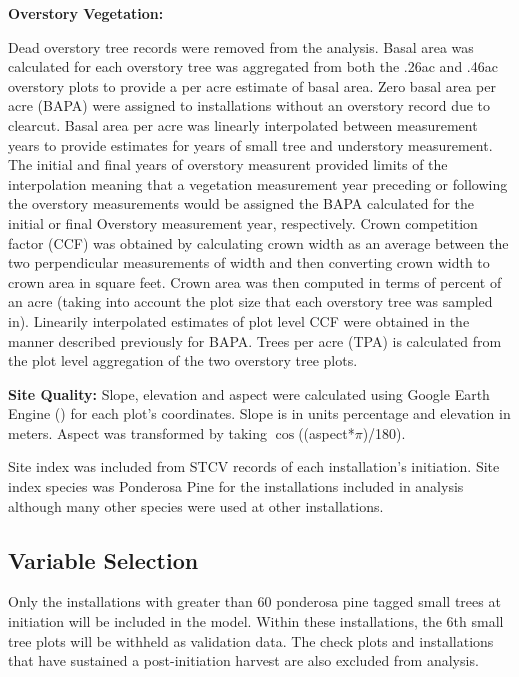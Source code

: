 \documentclass[11pt, letterpaper, fleqn]{article}
\begin{document}
\textbf{Overstory Vegetation:}

Dead overstory tree records were removed from the analysis.  Basal area was calculated for each overstory tree was aggregated from both the .26ac and .46ac overstory plots to provide a per acre estimate of basal area. Zero basal area per acre (BAPA) were assigned to installations without an overstory record due to clearcut. Basal area per acre was linearly interpolated between measurement years to provide estimates for years of small tree and understory measurement.  The initial and final years of overstory measurent provided limits of the interpolation meaning that a vegetation measurement year preceding or following the overstory measurements would be assigned the BAPA calculated for the initial or final Overstory measurement year, respectively.
Crown competition factor (CCF) was obtained by calculating crown width as an average between the two perpendicular measurements of width and then converting crown width to crown area in square feet. Crown area was then computed in terms of percent of an acre (taking into account the plot size that each overstory tree was sampled in). Linearily interpolated estimates of plot level CCF were obtained in the manner described previously for BAPA.
Trees per acre (TPA) is calculated from the plot level aggregation of the two overstory tree plots.

\textbf{Site Quality:}
Slope, elevation and aspect were calculated using Google Earth Engine (\cite{googleearthengine}) for each plot's coordinates. Slope is in units percentage and elevation in meters. Aspect was transformed by taking $\cos$((aspect*$\pi$)/180).


Site index was included from STCV records of each installation's initiation. Site index species was Ponderosa Pine for the installations included in analysis although many other species were used at other installations.




\newpage
\subsection{Variable Selection}


\par Only the installations with greater than 60 ponderosa pine tagged small trees at initiation will be included in the model.  Within these installations, the 6th small tree plots will be withheld as validation data. The check plots and installations that have sustained a post-initiation harvest are also excluded from analysis.  
\end{document}
